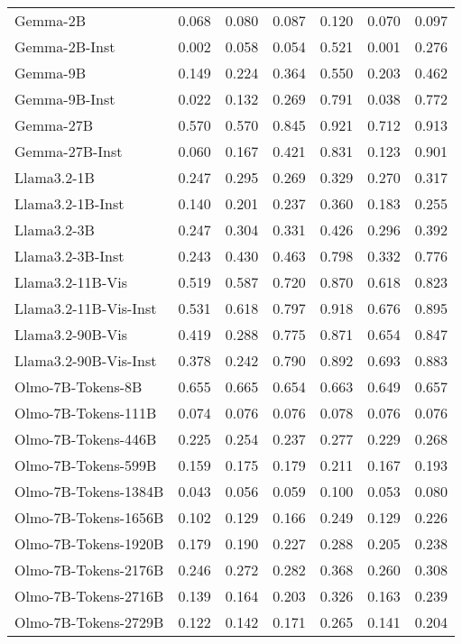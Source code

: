\begin{table*}[t!]
\begin{tabular}{ l | c c c c c c }
Gemma-2B & 0.068 & 0.080 & 0.087 & 0.120 & 0.070 & 0.097 \\ 
Gemma-2B-Inst & 0.002 & 0.058 & 0.054 & 0.521 & 0.001 & 0.276 \\ 
Gemma-9B & 0.149 & 0.224 & 0.364 & 0.550 & 0.203 & 0.462 \\ 
Gemma-9B-Inst & 0.022 & 0.132 & 0.269 & 0.791 & 0.038 & 0.772 \\ 
Gemma-27B & 0.570 & 0.570 & 0.845 & 0.921 & 0.712 & 0.913 \\ 
Gemma-27B-Inst & 0.060 & 0.167 & 0.421 & 0.831 & 0.123 & 0.901 \\ \hline
Llama3.2-1B & 0.247 & 0.295 & 0.269 & 0.329 & 0.270 & 0.317 \\ 
Llama3.2-1B-Inst & 0.140 & 0.201 & 0.237 & 0.360 & 0.183 & 0.255 \\ 
Llama3.2-3B & 0.247 & 0.304 & 0.331 & 0.426 & 0.296 & 0.392 \\ 
Llama3.2-3B-Inst & 0.243 & 0.430 & 0.463 & 0.798 & 0.332 & 0.776 \\ 
Llama3.2-11B-Vis & 0.519 & 0.587 & 0.720 & 0.870 & 0.618 & 0.823 \\ 
Llama3.2-11B-Vis-Inst & 0.531 & 0.618 & 0.797 & 0.918 & 0.676 & 0.895 \\ 
Llama3.2-90B-Vis & 0.419 & 0.288 & 0.775 & 0.871 & 0.654 & 0.847 \\ 
Llama3.2-90B-Vis-Inst & 0.378 & 0.242 & 0.790 & 0.892 & 0.693 & 0.883 \\ \hline
Olmo-7B-Tokens-8B & 0.655 & 0.665 & 0.654 & 0.663 & 0.649 & 0.657 \\
Olmo-7B-Tokens-111B & 0.074 & 0.076 & 0.076 & 0.078 & 0.076 & 0.076 \\ 
Olmo-7B-Tokens-446B & 0.225 & 0.254 & 0.237 & 0.277 & 0.229 & 0.268 \\ 
Olmo-7B-Tokens-599B & 0.159 & 0.175 & 0.179 & 0.211 & 0.167 & 0.193 \\ 
Olmo-7B-Tokens-1384B & 0.043 & 0.056 & 0.059 & 0.100 & 0.053 & 0.080 \\ 
Olmo-7B-Tokens-1656B & 0.102 & 0.129 & 0.166 & 0.249 & 0.129 & 0.226 \\ 
Olmo-7B-Tokens-1920B & 0.179 & 0.190 & 0.227 & 0.288 & 0.205 & 0.238 \\ 
Olmo-7B-Tokens-2176B & 0.246 & 0.272 & 0.282 & 0.368 & 0.260 & 0.308 \\ 
Olmo-7B-Tokens-2716B & 0.139 & 0.164 & 0.203 & 0.326 & 0.163 & 0.239 \\ 
Olmo-7B-Tokens-2729B & 0.122 & 0.142 & 0.171 & 0.265 & 0.141 & 0.204 \\ \hline

\end{tabular}
\end{table*}
